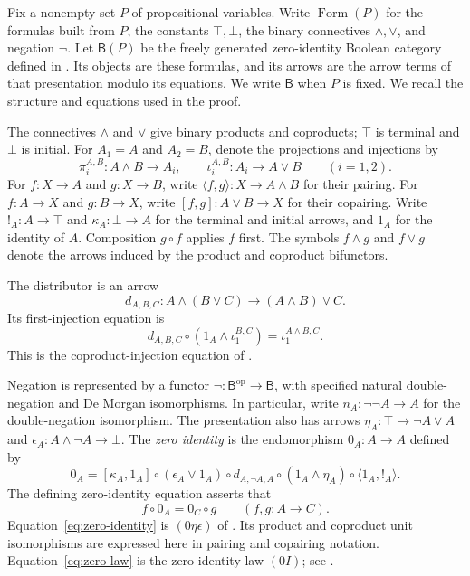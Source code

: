 \documentclass[11pt]{article}
\newcommand{\B}{\mathsf B}
\newcommand{\FormulaSet}{\operatorname{Form}}
\begin{document}
Fix a nonempty set $P$ of propositional variables. Write $\FormulaSet(P)$
for the formulas built from $P$, the constants $\top,\bot$, the binary
connectives $\wedge,\vee$, and negation $\neg$. Let $\B(P)$ be the
freely generated zero-identity Boolean category defined in
\cite[\S\S14.2--14.3]{DP}. Its objects are these formulas, and its
arrows are the arrow terms of that presentation modulo its equations.
We write $\B$ when $P$ is fixed. We recall the structure and equations
used in the proof.

The connectives $\wedge$ and $\vee$ give binary products and coproducts;
$\top$ is terminal and $\bot$ is initial. For $A_1=A$ and $A_2=B$,
denote the projections and injections by
\[
 \pi_i^{A,B}:A\wedge B\longrightarrow A_i,
 \qquad
 \iota_i^{A,B}:A_i\longrightarrow A\vee B
 \qquad(i=1,2).
\]
For $f:X\to A$ and $g:X\to B$, write
$\langle f,g\rangle:X\to A\wedge B$ for their pairing.
For $f:A\to X$ and $g:B\to X$, write
$[f,g]:A\vee B\to X$ for their copairing. Write
$!_A:A\to\top$ and $\kappa_A:\bot\to A$ for the terminal and initial
arrows, and $1_A$ for the identity of $A$. Composition $g\circ f$
applies $f$ first. The symbols $f\wedge g$ and $f\vee g$ denote the
arrows induced by the product and coproduct bifunctors.

The distributor is an arrow
\[
 d_{A,B,C}:A\wedge(B\vee C)\longrightarrow(A\wedge B)\vee C.
\]
Its first-injection equation is
\begin{equation}
 d_{A,B,C}\circ(1_A\wedge\iota_1^{B,C})
   =\iota_1^{A\wedge B,C}.
 \label{eq:first-injection}
\end{equation}
This is the coproduct-injection equation of
\cite[\S11.1, p.~234]{DP}.

Negation is represented by a functor
$\neg:\B^{\mathrm{op}}\to\B$, with specified natural
double-negation and De Morgan isomorphisms. In particular, write
$n_A:\neg\neg A\to A$ for the double-negation isomorphism.
The presentation also has arrows
$\eta_A:\top\to\neg A\vee A$ and
$\epsilon_A:A\wedge\neg A\to\bot$.
The \emph{zero identity} is the endomorphism $0_A:A\to A$ defined by
\begin{equation}
 0_A=[\kappa_A,1_A]\circ(\epsilon_A\vee1_A)\circ d_{A,\neg A,A}
     \circ(1_A\wedge\eta_A)\circ\langle1_A,!_A\rangle.
 \label{eq:zero-identity}
\end{equation}
The defining zero-identity equation asserts that
\begin{equation}
 f\circ0_A=0_C\circ g
 \qquad(f,g:A\to C).
 \label{eq:zero-law}
\end{equation}
Equation~\eqref{eq:zero-identity} is $(0\eta\epsilon)$ of
\cite[\S14.2, p.~317]{DP}. Its product and coproduct unit isomorphisms
are expressed here in pairing and copairing notation.
Equation~\eqref{eq:zero-law} is the zero-identity law $(0I)$;
see \cite[\S14.3, p.~322]{DP}.
\end{document}
